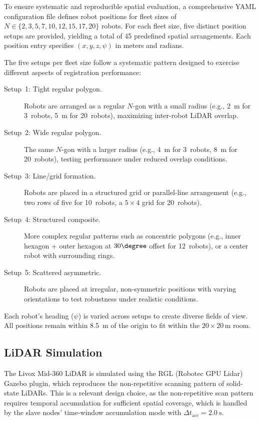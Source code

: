 To ensure systematic and reproducible spatial evaluation, a
comprehensive YAML configuration file defines robot positions
for fleet sizes of $N \in \{2, 3, 5, 7, 10, 12, 15, 17, 20\}$
robots.
For each fleet size, five distinct position setups are provided,
yielding a total of 45 predefined spatial arrangements.
Each position entry specifies $(x, y, z, \psi)$ in meters and
radians.

The five setups per fleet size follow a systematic pattern
designed to exercise different aspects of registration performance:

\begin{description}
    \item[Setup~1: Tight regular polygon.]
        Robots are arranged as a regular $N$-gon with a small
        radius (e.g., \SI{2}{\metre} for 3~robots,
        \SI{5}{\metre} for 20~robots), maximizing inter-robot
        LiDAR overlap.
    \item[Setup~2: Wide regular polygon.]
        The same $N$-gon with a larger radius (e.g., \SI{4}{\metre}
        for 3~robots, \SI{8}{\metre} for 20~robots), testing
        performance under reduced overlap conditions.
    \item[Setup~3: Line/grid formation.]
        Robots are placed in a structured grid or parallel-line
        arrangement (e.g., two rows of five for 10~robots,
        a $5 \times 4$ grid for 20~robots).
    \item[Setup~4: Structured composite.]
        More complex regular patterns such as concentric polygons
        (e.g., inner hexagon + outer hexagon at $30\degree$ offset for
        12~robots), or a center robot with surrounding rings.
    \item[Setup~5: Scattered asymmetric.]
        Robots are placed at irregular, non-symmetric positions
        with varying orientations to test robustness under
        realistic conditions.
\end{description}

Each robot's heading ($\psi$) is varied across setups to create
diverse fields of view.
All positions remain within \SI{8.5}{\metre} of the origin to
fit within the $20 \times 20$\,m room.

\subsection{LiDAR Simulation}

The Livox Mid-360 LiDAR is simulated using the RGL (Robotec GPU
Lidar) Gazebo plugin, which reproduces the non-repetitive scanning
pattern of solid-state LiDARs.
This is a relevant design choice, as the non-repetitive scan pattern
requires temporal accumulation for sufficient spatial coverage, which
is handled by the slave nodes' time-window accumulation mode with
$\Delta t_\mathrm{acc} = \SI{2.0}{\second}$.

